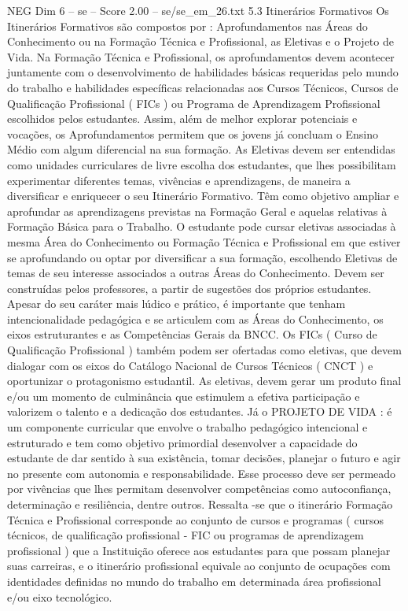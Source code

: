 \begin{textsample}{NEG Dim 6 – se – Score 2.00 – se/se\_em\_26.txt}  \label{ex:f6_neg_250}
5.3 Itinerários Formativos Os Itinerários Formativos são compostos por : Aprofundamentos nas Áreas do Conhecimento ou na Formação Técnica e Profissional, as Eletivas e o Projeto de Vida.
Na Formação Técnica e Profissional, os aprofundamentos devem acontecer juntamente com o desenvolvimento de habilidades básicas requeridas pelo mundo do trabalho e habilidades específicas relacionadas aos Cursos Técnicos, Cursos de Qualificação Profissional ( FICs ) ou Programa de Aprendizagem Profissional escolhidos pelos estudantes.
Assim, além de melhor explorar potenciais e vocações, os Aprofundamentos permitem que os jovens já concluam o Ensino Médio com algum diferencial na sua formação.
As Eletivas devem ser entendidas como unidades curriculares de livre escolha dos estudantes, que lhes possibilitam experimentar diferentes temas, vivências e aprendizagens, de maneira a diversificar e enriquecer o seu Itinerário Formativo.
Têm como objetivo ampliar e aprofundar as aprendizagens previstas na Formação Geral e aquelas relativas à Formação Básica para o Trabalho.
O estudante pode cursar eletivas associadas à mesma Área do Conhecimento ou Formação Técnica e Profissional em que estiver se aprofundando ou optar por diversificar a sua formação, escolhendo Eletivas de temas de seu interesse associados a outras Áreas do Conhecimento.
Devem ser construídas pelos professores, a partir de sugestões dos próprios estudantes.
Apesar do seu caráter mais lúdico e prático, é importante que tenham intencionalidade pedagógica e se articulem com as Áreas do Conhecimento, os eixos estruturantes e as Competências Gerais da BNCC.
Os FICs ( Curso de Qualificação Profissional ) também podem ser ofertadas como eletivas, que devem dialogar com os eixos do Catálogo Nacional de Cursos Técnicos ( CNCT ) e oportunizar o protagonismo estudantil.
As eletivas, devem gerar um produto final e/ou um momento de culminância que estimulem a efetiva participação e valorizem o talento e a dedicação dos estudantes.
Já o PROJETO DE VIDA : é um componente curricular que envolve o trabalho pedagógico intencional e estruturado e tem como objetivo primordial desenvolver a capacidade do estudante de dar sentido à sua existência, tomar decisões, planejar o futuro e agir no presente com autonomia e responsabilidade.
Esse processo deve ser permeado por vivências que lhes permitam desenvolver competências como autoconfiança, determinação e resiliência, dentre outros.
Ressalta -se que o itinerário Formação Técnica e Profissional corresponde ao conjunto de cursos e programas ( cursos técnicos, de qualificação profissional - FIC ou programas de aprendizagem profissional ) que a Instituição oferece aos estudantes para que possam planejar suas carreiras, e o itinerário profissional equivale ao conjunto de ocupações com identidades definidas no mundo do trabalho em determinada área profissional e/ou eixo tecnológico.

\end{textsample}
